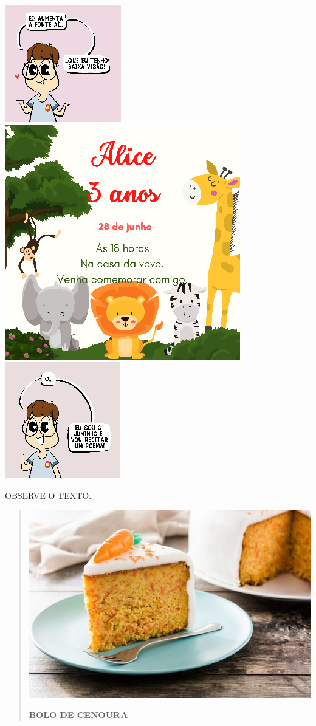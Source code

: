 \includegraphics[width=.3\textwidth]{media/image145.png}
\includegraphics[width=.3\textwidth]{media/image147.png}
\includegraphics[width=.3\textwidth]{media/image152.png}

\bigskip
OBSERVE O TEXTO.

\begin{quote}
\includegraphics[width=.8\textwidth]{media/image153.jpg}

\textbf{BOLO DE CENOURA}
\end{quote}

